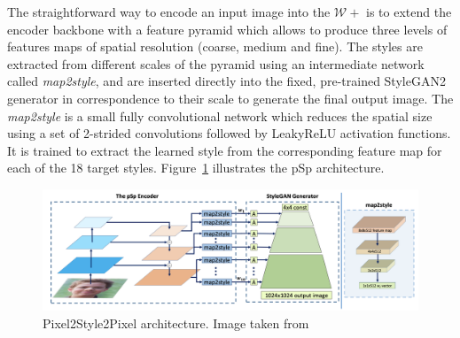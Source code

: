 The straightforward way to encode an input image into the $\mathcal{W}+$ is to extend the encoder backbone with a feature pyramid which allows to produce three levels of features maps of spatial resolution (coarse, medium and fine).
The styles are extracted from different scales of the pyramid using an intermediate network called \textit{map2style}, and are inserted directly into the fixed, pre-trained StyleGAN2 generator in correspondence to their scale to generate the final output image.
The \textit{map2style} is a small fully convolutional network which reduces the spatial size using a set of 2-strided convolutions followed by LeakyReLU activation functions. It is trained to extract the learned style from the corresponding feature map for each of the 18 target styles. Figure~\ref{fig:pSp encoder architecture} illustrates the pSp architecture.
 \begin{figure}[htbp]
\centering
  \includegraphics[scale=0.43]{figures/psp-architecture.png}
  \caption{Pixel2Style2Pixel architecture. Image taken from \cite{pSp}}
  \label{fig:pSp encoder architecture}
\end{figure}

